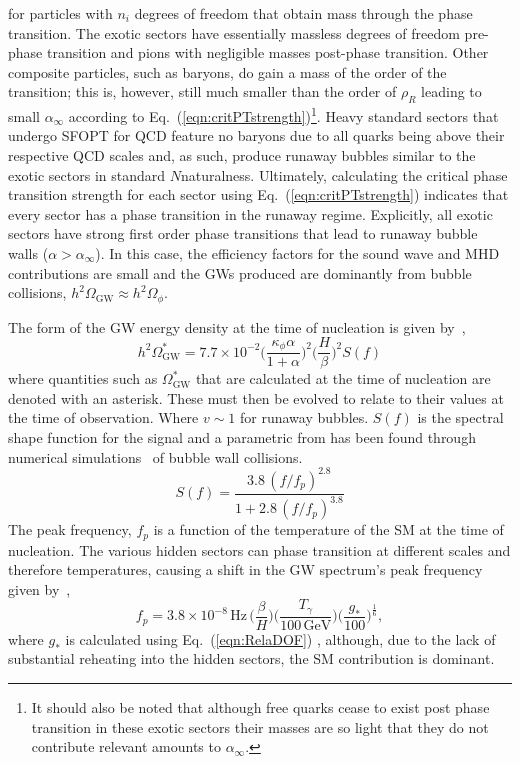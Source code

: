 \documentclass[nofootinbib,twocolumn,preprintnumbers]{revtex4-1}
\begin{document}
for particles with $n_i$ degrees of freedom that obtain mass through the phase transition. The exotic sectors have essentially massless degrees of freedom pre-phase transition and pions with negligible masses post-phase transition. Other composite particles, such as baryons, do gain a mass of the order of the transition; this is, however, still much smaller than the order of $\rho_R$ leading to small $\alpha_{\infty}$ according to Eq.~(\ref{eqn:critPTstrength})\footnote {It should also be noted that although free quarks cease to exist post phase transition in these exotic sectors their masses are so light that they do not contribute relevant amounts to $\alpha_{\infty}$.}. Heavy standard sectors that undergo SFOPT for QCD feature no baryons due to all quarks being above their respective QCD scales and, as such, produce runaway bubbles similar to the exotic sectors in standard $N$naturalness. Ultimately, calculating the critical phase transition strength for each sector using Eq.~(\ref{eqn:critPTstrength}) indicates that every sector has a phase transition in the runaway regime. Explicitly, all exotic sectors have strong first order phase transitions that lead to runaway bubble walls ($\alpha >\alpha_{\infty}$). In this case, the efficiency factors for the sound wave and MHD contributions are small and the GWs produced are dominantly from bubble collisions, $h^2\Omega_{\textrm{GW}} \approx h^2\Omega_{\phi}$. 

The form of the GW energy density at the time of nucleation is given by~\citep{Breitbach:2018ddu},
\begin{equation}\label{eqn::GWengdensity}
h^2\Omega_{\textrm{GW}}^* = 7.7\times 10^{-2} \bigg( \frac{\kappa_{\phi} \alpha}{1 + \alpha} \bigg)^2 \bigg( \frac{H}{\beta} \bigg)^2  S(f)
\end{equation}
where quantities such as $\Omega_{\textrm{GW}}^*$ that are calculated at the time of nucleation are denoted with an asterisk. These must then be evolved to relate to their values at the time of observation. Where  $v \sim 1$ for runaway bubbles. $S(f)$ is the spectral shape function for the signal and a parametric from has been found through numerical simulations~\cite{Huber_2008} of bubble wall collisions.
\begin{equation}\label{eqn::spectralshape}
S(f) = \frac{3.8 \,(f/f_p)^{2.8}}{1 + 2.8\,(f/f_p)^{3.8}}
\end{equation}
The peak frequency, $f_{p}$ is a function of the temperature of the SM at the time of nucleation.  The various hidden sectors can phase transition at different scales and therefore temperatures, causing a shift in the GW spectrum's peak frequency given by~\cite{Huber_2008},
%
\begin{equation}\label{eqn:peakFrequency}
f_{p} = 3.8 \times 10^{-8} \, \textrm{Hz}\, \bigg( \frac{\beta}{H}\bigg)\bigg(\frac{T_{\gamma}}{100 \, \textrm{GeV}}\bigg)\bigg(\frac{g_{*}}{100}\bigg)^{\frac{1}{6}},
\end{equation}
%
where $g_*$  is calculated using Eq.~(\ref{eqn:RelaDOF}) , although, due to the lack of substantial reheating into the hidden sectors, the SM contribution is dominant. 
\end{document}
